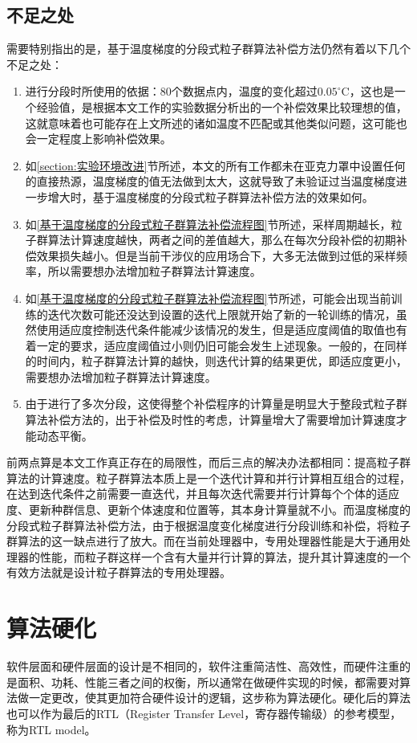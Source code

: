 \subsection{不足之处}
\label{基于温度梯度的分段粒子群算法补偿方法的不足之处}
需要特别指出的是，基于温度梯度的分段式粒子群算法补偿方法仍然有着以下几个不足之处：
\begin{enumerate}
  \item 进行分段时所使用的依据：80个数据点内，温度的变化超过$0.05^{\circ} \mathrm{C}$，这也是一个经验值，是根据本文工作的实验数据分析出的一个补偿效果比较理想的值，这就意味着也可能存在上文所述的诸如温度不匹配或其他类似问题，这可能也会一定程度上影响补偿效果。
  \item 如\ref{section:实验环境改进}节所述，本文的所有工作都未在亚克力罩中设置任何的直接热源，温度梯度的值无法做到太大，这就导致了未验证过当温度梯度进一步增大时，基于温度梯度的分段式粒子群算法补偿方法的效果如何。
  \item 如\ref{基于温度梯度的分段式粒子群算法补偿流程图}节所述，采样周期越长，粒子群算法计算速度越快，两者之间的差值越大，那么在每次分段补偿的初期补偿效果损失越小。但是当前干涉仪的应用场合下，大多无法做到过低的采样频率，所以需要想办法增加粒子群算法计算速度。
  \item 如\ref{基于温度梯度的分段式粒子群算法补偿流程图}节所述，可能会出现当前训练的迭代次数可能还没达到设置的迭代上限就开始了新的一轮训练的情况，虽然使用适应度控制迭代条件能减少该情况的发生，但是适应度阈值的取值也有着一定的要求，适应度阈值过小则仍旧可能会发生上述现象。一般的，在同样的时间内，粒子群算法计算的越快，则迭代计算的结果更优，即适应度更小，需要想办法增加粒子群算法计算速度。
  \item 由于进行了多次分段，这使得整个补偿程序的计算量是明显大于整段式粒子群算法补偿方法的，出于补偿及时性的考虑，计算量增大了需要增加计算速度才能动态平衡。
\end{enumerate}

前两点算是本文工作真正存在的局限性，而后三点的解决办法都相同：提高粒子群算法的计算速度。粒子群算法本质上是一个迭代计算和并行计算相互组合的过程，在达到迭代条件之前需要一直迭代，并且每次迭代需要并行计算每个个体的适应度、更新种群信息、更新个体速度和位置等，其本身计算量就不小。而温度梯度的分段式粒子群算法补偿方法，由于根据温度变化梯度进行分段训练和补偿，将粒子群算法的这一缺点进行了放大。而在当前处理器中，专用处理器性能是大于通用处理器的性能，而粒子群这样一个含有大量并行计算的算法，提升其计算速度的一个有效方法就是设计粒子群算法的专用处理器。

\section{算法硬化}
软件层面和硬件层面的设计是不相同的，软件注重简洁性、高效性，而硬件注重的是面积、功耗、性能三者之间的权衡，所以通常在做硬件实现的时候，都需要对算法做一定更改，使其更加符合硬件设计的逻辑，这步称为算法硬化。硬化后的算法也可以作为最后的RTL（Register Transfer Level，寄存器传输级）的参考模型，称为RTL model。

